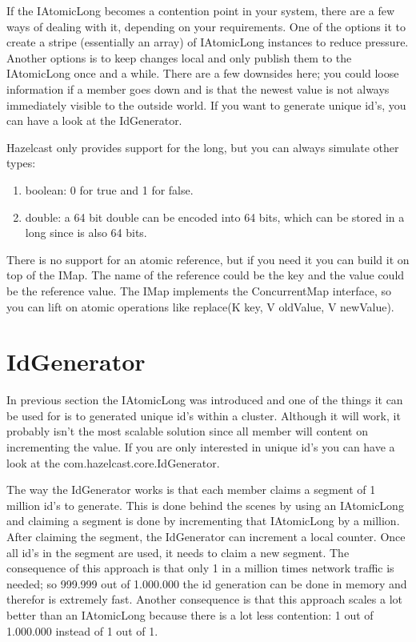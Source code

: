 If the IAtomicLong becomes a contention point in your system, there are a few ways of dealing with it, depending on your requirements. One of the options it to create a stripe (essentially an array) of IAtomicLong instances to reduce pressure. Another options is to keep changes local and only publish them to the IAtomicLong once and a while. There are a few downsides here; you could loose information if a member goes down and is that the newest value is not always immediately visible to the outside world. If you want to generate unique id's, you can have a look at the IdGenerator.

Hazelcast only provides support for the long, but you can always simulate other types:
\begin{enumerate}
\item boolean: 0 for true and 1 for false.
\item double: a 64 bit double can be encoded into 64 bits, which can be stored in a long since is also 64 bits.
\end{enumerate}
There is no support for an atomic reference, but if you need it you can build it on top of the IMap. The name of the reference could be the key and the value could be the reference value. The IMap implements the ConcurrentMap interface, so you can lift on atomic operations like replace(K key, V oldValue, V newValue). 

\section{IdGenerator}
In previous section the IAtomicLong was introduced and one of the things it can be used for is to generated unique id's within a cluster. Although it will work, it probably isn't the most scalable solution since all member will content on incrementing the value. If you are only interested in unique id's you can have a look at the com.hazelcast.core.IdGenerator.

The way the IdGenerator works is that each member claims a segment of 1 million id's to generate. This is done behind the scenes by using an IAtomicLong and claiming a segment is done by incrementing that IAtomicLong by a million. After claiming the segment, the IdGenerator can increment a local counter. Once all id's in the segment are used, it needs to claim a new segment. The consequence of this approach is that only 1 in a million times network traffic is needed; so 999.999 out of 1.000.000 the id generation can be done in memory and therefor is extremely fast. Another consequence is that this approach scales a lot better than an IAtomicLong because there is a lot less contention: 1 out of 1.000.000 instead of 1 out of 1.

